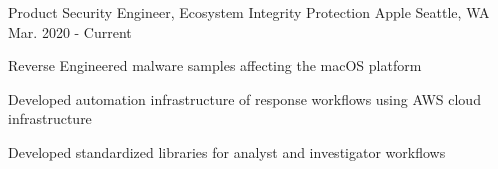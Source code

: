 


\begin{cventries}




\cventry
{Product Security Engineer, Ecosystem Integrity Protection} %
{Apple} %
{Seattle, WA} %
{Mar. 2020 - Current} %
{ %
\begin{cvitems}
\item {Reverse Engineered malware samples affecting the macOS platform}
\item {Developed automation infrastructure of response workflows using AWS cloud infrastructure}
\item {Developed standardized libraries for analyst and investigator workflows}
\end{cvitems}
}



\end{cventries}
